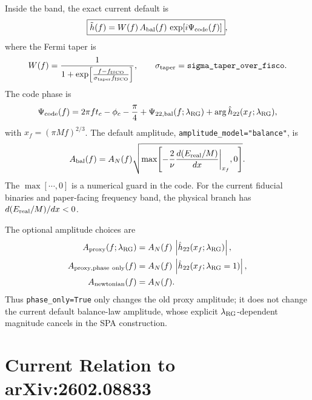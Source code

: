 \documentclass[11pt]{article}
\begin{document}
Inside the band, the exact current default is
\begin{equation}
  \boxed{
  \tilde h(f)
  =
  W(f)\,
  A_{\rm bal}(f)\,
  \exp\!\left[i\Psi_{\rm code}(f)\right]
  },
\end{equation}
where the Fermi taper is
\begin{equation}
  W(f)
  =
  \frac{1}{
    1+\exp\!\left[
      \frac{f-f_{\rm ISCO}}
      {\sigma_{\rm taper} f_{\rm ISCO}}
    \right]
  },
  \qquad
  \sigma_{\rm taper}
  =
  \texttt{sigma\_taper\_over\_fisco}.
\end{equation}
The code phase is
\begin{equation}
  \Psi_{\rm code}(f)
  =
  2\pi f t_c
  - \phi_c
  - \frac{\pi}{4}
  + \Psi_{22,{\rm bal}}(f;\lambda_{\rm RG})
  + \arg\hat h_{22}(x_f;\lambda_{\rm RG}),
\end{equation}
with \(x_f=(\pi M f)^{2/3}\). The default amplitude,
\texttt{amplitude\_model="balance"}, is
\begin{equation}
  A_{\rm bal}(f)
  =
  A_N(f)
  \sqrt{
    \max\!\left[
      -\frac{2}{\nu}\frac{d(E_{\rm real}/M)}{dx}\bigg|_{x_f},
      0
    \right]
  }.
\end{equation}
The \(\max[\cdots,0]\) is a numerical guard in the code. For the current
fiducial binaries and paper-facing frequency band, the physical branch has
\(d(E_{\rm real}/M)/dx<0\).

The optional amplitude choices are
\begin{align}
  A_{\rm proxy}(f;\lambda_{\rm RG})
  &=
  A_N(f)\,
  \left|\hat h_{22}(x_f;\lambda_{\rm RG})\right|,
  \\
  A_{\rm proxy,phase\ only}(f)
  &=
  A_N(f)\,
  \left|\hat h_{22}(x_f;\lambda_{\rm RG}=1)\right|,
  \\
  A_{\rm newtonian}(f)
  &=
  A_N(f).
\end{align}
Thus \texttt{phase\_only=True} only changes the old proxy amplitude; it does
not change the current default balance-law amplitude, whose explicit
\(\lambda_{\rm RG}\)-dependent magnitude cancels in the SPA construction.

\section{Current Relation to arXiv:2602.08833}
\end{document}
